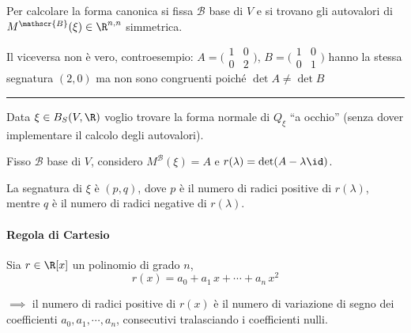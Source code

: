 Per calcolare la forma canonica si fissa $ \mathscr{B} $ base di $ V $ e si trovano gli autovalori di $ M^{ \mathscr{B}}(\xi) \in \R^{n,n}$ simmetrica.



Il viceversa non è vero, controesempio: $ A=\bigl(\begin{smallmatrix}
    1 & 0 \\ 0 & 2
\end{smallmatrix}\bigr) $, $ B=\bigl(\begin{smallmatrix}
    1 & 0 \\ 0 & 1
\end{smallmatrix}\bigr) $ hanno la stessa segnatura $ (2, 0)$ ma non sono congruenti poiché $ \det A \neq \det B $

\rule{7em}{.4pt}

Data $ \xi \in B_{S}(V, \R)$ voglio trovare la forma normale di $ Q_{\xi}  $ ``a occhio'' (senza dover implementare il calcolo degli autovalori).

Fisso $ \mathscr{B} $ base di $ V $, considero $ M^{ \mathscr{B}}(\xi)=A $ e $ r(\lambda)=\det (A-\lambda\id) $.

La segnatura di $ \xi $ è $ (p, q) $, dove $ p $ è il numero di radici positive di $ r(\lambda) $, mentre $ q $ è il numero di radici negative di $ r(\lambda) $.

\paragraph{Regola di Cartesio} Sia $ r \in \R[x] $ un polinomio di grado $ n $, \[
        r(x)=a_0+a_1\,x+\cdots+a_{n}\, x^{2} 
    \] 
    
    $\implies$ il numero di radici positive di $ r(x) $ è il numero di variazione di segno dei coefficienti $ a_0, a_1, \cdots, a_{n}$, consecutivi tralasciando i coefficienti nulli.

